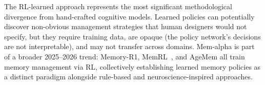 The RL-learned approach represents the most significant methodological
divergence from hand-crafted cognitive models. Learned policies can
potentially discover non-obvious management strategies that human
designers would not specify, but they require training data, are
opaque (the policy network's decisions are not interpretable), and may
not transfer across domains. Mem-alpha is part of a broader 2025--2026
trend: Memory-R1, MemRL~\cite{zhang2026memrl}, and AgeMem all train
memory management via RL, collectively establishing learned memory
policies as a distinct paradigm alongside rule-based and
neuroscience-inspired approaches.
